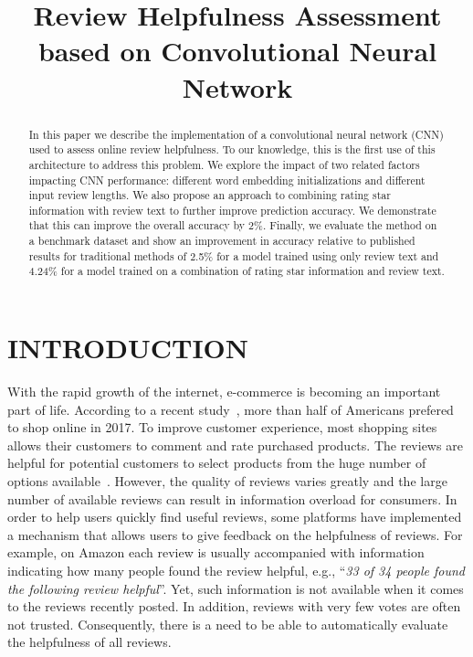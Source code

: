 \documentclass[conference,compsoc]{IEEEtran}
\begin{document}
\title{Review Helpfulness Assessment based on Convolutional Neural Network}


\author{
}


\maketitle
\begin{abstract}
In this paper we describe the implementation of a convolutional neural network (CNN) used to assess online review helpfulness. To our knowledge, this is the first use of this architecture to address this problem. We explore the impact of two related factors impacting CNN performance: different word embedding initializations and different input review lengths. We also propose an approach to combining rating star information with review text to further improve prediction accuracy. We demonstrate that this can improve the overall accuracy by 2\%. Finally, we evaluate the method on a benchmark dataset and show an improvement in accuracy relative to published results for traditional methods of 2.5\% for a model trained using only review text and  4.24\% for a model trained on a combination of rating star information and review text.
\end{abstract}

\section{INTRODUCTION}\label{sec:introduction}

With the rapid growth of the internet, e-commerce is becoming an important part of life. According to a recent study~\cite{survey1}, more than half of Americans prefered to shop online in 2017. To improve customer experience, most shopping sites allows their customers to comment and rate purchased products. The reviews are helpful for potential customers to select products from the huge number of options available~\cite{Zhu_2010, Mudambi_2010, Baek_2012}. However, the quality of reviews varies greatly and the large number of available reviews can result in information overload for consumers.  In order to help users quickly find useful reviews, some platforms have implemented a mechanism that allows users to give feedback on the helpfulness of reviews. For example, on Amazon each review is usually accompanied with information indicating how many people found the review helpful, e.g., ``\textit{33 of 34 people found the following review helpful}''. Yet, such information is not available when it comes to the reviews recently posted. In addition, reviews with very few votes are often not trusted. Consequently, there is a need to be able to automatically evaluate the helpfulness of all reviews.
\end{document}
